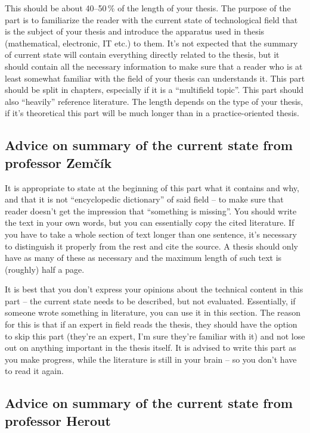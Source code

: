 This should be about 40--50\,\% of the length of your thesis. The purpose of the part is to familiarize the reader with the current state of technological field that is the subject of your thesis and introduce the apparatus used in thesis (mathematical, electronic, IT etc.) to them. It's not expected that the summary of current state will contain everything directly related to the thesis, but it should contain all the necessary information to make sure that a reader who is at least somewhat familiar with the field of your thesis can understands it. This part should be split in chapters, especially if it is a ``multifield topic''. This part should also ``heavily'' reference literature. The length depends on the type of your thesis, if it's theoretical this part will be much longer than in a practice-oriented thesis.

\subsection*{Advice on summary of the current state from professor Zemčík}

It is appropriate to state at the beginning of this part what it contains and why, and that it is not ``encyclopedic dictionary'' of said field -- to make sure that reader doesn't get the impression that ``something is missing''. You should write the text in your own words, but you can essentially copy the cited literature. If you have to take a whole section of text longer than one sentence, it's necessary to distinguish it properly from the rest and cite the source. A thesis should only have as many of these as necessary and the maximum length of such text is (roughly) half a page.

It is best that you don't express your opinions about the technical content in this part -- the current state needs to be described, but not evaluated. Essentially, if someone wrote something in literature, you can use it in this section. The reason for this is that if an expert in field reads the thesis, they should have the option to skip this part (they're an expert, I'm sure they're familiar with it) and not lose out on anything important in the thesis itself. It is advised to write this part as you make progress, while the literature is still in your brain -- so you don't have to read it again. 


\subsection*{Advice on summary of the current state from professor Herout}

